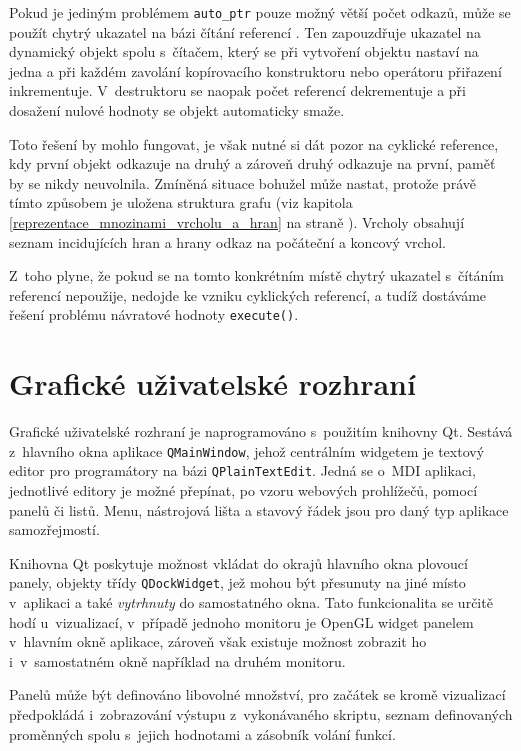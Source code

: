 \documentclass[11pt,twoside,a4paper]{book}
\begin{document}
Pokud je jediným problémem \texttt{auto\_ptr} pouze možný větší počet odkazů, může se použít chytrý ukazatel na bázi čítání referencí \cite{smartp}. Ten zapouzdřuje ukazatel na dynamický objekt spolu s~čítačem, který se při vytvoření objektu nastaví na jedna a při každém zavolání kopírovacího konstruktoru nebo operátoru přiřazení inkrementuje. V~destruktoru se naopak počet referencí dekrementuje a při dosažení nulové hodnoty se objekt automaticky smaže.

Toto řešení by mohlo fungovat, je však nutné si dát pozor na cyklické reference, kdy první objekt odkazuje na druhý a zároveň druhý odkazuje na první, paměť by se nikdy neuvolnila. Zmíněná situace bohužel může nastat, protože právě tímto způsobem je uložena struktura grafu (viz kapitola \ref{reprezentace_mnozinami_vrcholu_a_hran} na straně \pageref{reprezentace_mnozinami_vrcholu_a_hran}). Vrcholy obsahují seznam incidujících hran a hrany odkaz na počáteční a koncový vrchol.

Z~toho plyne, že pokud se na tomto konkrétním místě chytrý ukazatel s~čítáním referencí nepoužije, nedojde ke vzniku cyklických referencí, a tudíž dostáváme řešení problému návratové hodnoty \texttt{execute()}.


\section{Grafické uživatelské rozhraní}

Grafické uživatelské rozhraní je naprogramováno s~použitím knihovny Qt. Sestává z~hlav\-ní\-ho okna aplikace \texttt{QMainWindow}, jehož centrálním widgetem je textový editor pro programátory na bázi \texttt{QPlainTextEdit}. Jedná se o~MDI aplikaci, jednotlivé editory je možné přepínat, po vzoru webových prohlížečů, pomocí panelů či listů. Menu, nástrojová lišta a stavový řádek jsou pro daný typ aplikace samozřejmostí.

Knihovna Qt poskytuje možnost vkládat do okrajů hlavního okna plovoucí panely, objekty třídy \texttt{QDockWidget}, jež mohou být přesunuty na jiné místo v~aplikaci a také \textit{vytrhnuty} do samostatného okna. Tato funkcionalita se určitě hodí u~vizualizací, v~případě jednoho monitoru je OpenGL widget panelem v~hlavním okně aplikace, zároveň však existuje možnost zobrazit ho i~v~samostatném okně například na druhém monitoru.

Panelů může být definováno libovolné množství, pro začátek se kromě vizualizací před\-po\-klá\-dá i~zobrazování výstupu z~vykonávaného skriptu, seznam definovaných proměnných spolu s~jejich hodnotami a zásobník volání funkcí.
\end{document}
